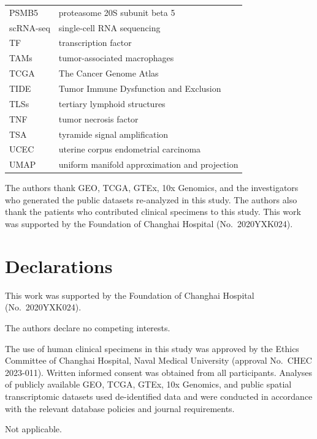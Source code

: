 \documentclass[pdflatex,sn-vancouver-num]{sn-jnl}
\begin{document}
\begin{longtable}{p{3cm} p{9cm}}
PSMB5 & proteasome 20S subunit beta 5 \\
scRNA-seq & single-cell RNA sequencing \\
TF & transcription factor \\
TAMs & tumor-associated macrophages \\
TCGA & The Cancer Genome Atlas \\
TIDE & Tumor Immune Dysfunction and Exclusion \\
TLSs & tertiary lymphoid structures \\
TNF & tumor necrosis factor \\
TSA & tyramide signal amplification \\
UCEC & uterine corpus endometrial carcinoma \\
UMAP & uniform manifold approximation and projection \\
\bottomrule
\end{longtable}


The authors thank GEO, TCGA, GTEx, 10x Genomics, and the investigators who generated the public datasets re-analyzed in this study. The authors also thank the patients who contributed clinical specimens to this study. This work was supported by the Foundation of Changhai Hospital (No.~2020YXK024).

\section*{Declarations}

This work was supported by the Foundation of Changhai Hospital (No.~2020YXK024).

The authors declare no competing interests.

The use of human clinical specimens in this study was approved by the Ethics Committee of Changhai Hospital, Naval Medical University (approval No.~CHEC 2023-011). Written informed consent was obtained from all participants. Analyses of publicly available GEO, TCGA, GTEx, 10x Genomics, and public spatial transcriptomic datasets used de-identified data and were conducted in accordance with the relevant database policies and journal requirements.

Not applicable.
\end{document}
